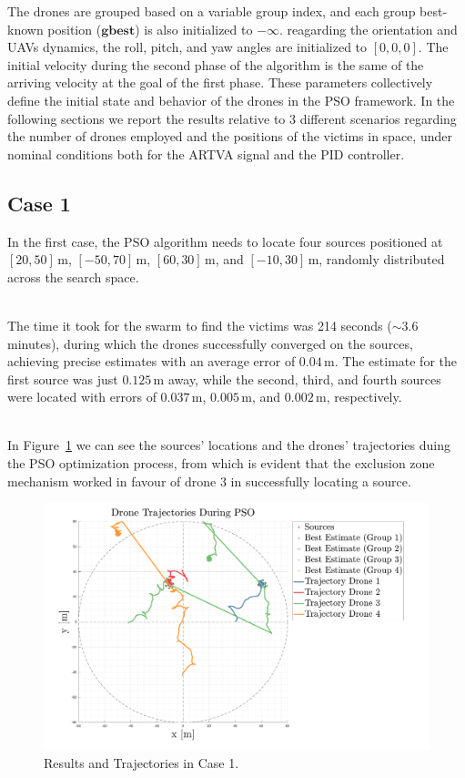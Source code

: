 The drones are grouped based on a variable group index, and 
each group best-known position ($\mathbf{gbest}$) is also 
initialized to \(-\infty\).
reagarding the orientation and UAVs dynamics, the roll, pitch, and yaw angles
are initialized to \([0, 0, 0]\).
The initial velocity during the second phase of the algorithm is the same
of the arriving velocity at the goal of the first phase.
These parameters collectively define the initial state and behavior of the 
drones in the PSO framework.
In the following sections we report the results relative to 3 different 
scenarios regarding the number of drones employed and the positions of the victims
in space, under nominal conditions both for the ARTVA signal and the PID controller.

\subsection{Case 1}
In the first case, the PSO algorithm needs to locate four sources positioned 
at \([20, 50] \, \text{m}\), \([-50, 70] \, \text{m}\), \([60, 30] \, \text{m}\), 
and \([-10, 30] \, \text{m}\), 
randomly distributed across the search space.

\noindent\\
The time it took for the swarm to find the victims was 214 seconds (\(\sim 3.6\) minutes),
during which the drones successfully converged on the sources, 
achieving precise estimates with an average error of \(0.04 \, \text{m}\). The estimate for the first source was 
just \(0.125 \, \text{m}\) away, while the second, third, and fourth sources were 
located with errors of \(0.037 \, \text{m}\), \(0.005 \, \text{m}\), and \(0.002 \, \text{m}\), respectively.

\noindent\\
In Figure~\ref{fig:case1} we can see  
the sources' locations and the drones' trajectories duing the PSO 
optimization process, from which is evident that the exclusion zone mechanism
worked in favour of drone 3 in successfully locating a source.

\begin{figure}
    \centering
    \includegraphics[width=1.06\textwidth]{images/case_1.pdf}
    \caption[PSO Case 1]{Results and Trajectories in Case 1.}
    \label{fig:case1}
\end{figure}

